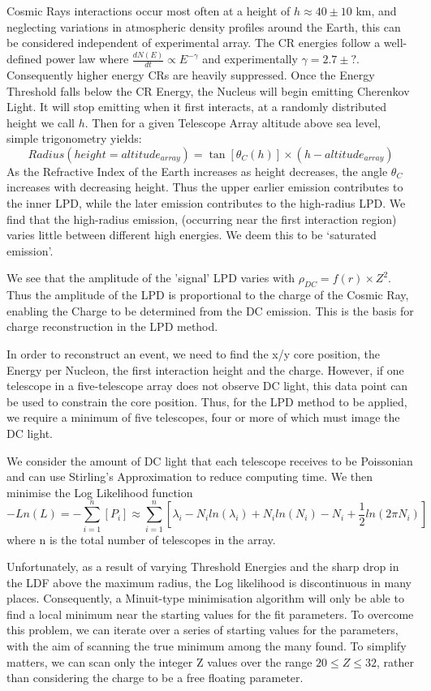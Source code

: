 \documentclass{article}
\begin{document}
Cosmic Rays interactions occur most often at a height of $h \approx 40 \pm 10$ km, and neglecting variations in atmospheric density profiles around the Earth, this can be considered independent of experimental array. The CR energies follow a well-defined power law where $ \frac{dN(E)}{dt} \propto E^{-\gamma} $ and experimentally $ \gamma = 2.7 \pm ? $. Consequently higher energy CRs are heavily suppressed. Once the Energy Threshold falls below the CR Energy, the Nucleus will begin emitting Cherenkov Light. It will stop emitting when it first interacts, at a randomly distributed height we call $h$. Then for a given Telescope Array altitude above sea level, simple trigonometry yields:
\[ Radius(height = altitude_{array}) = \tan [\theta_{C}(h)] \times (h - altitude_{array})\]
As the Refractive Index of the Earth increases as height decreases, the angle $\theta_{C}$ increases with decreasing height. Thus the upper earlier emission contributes to the inner LPD, while the later emission contributes to the high-radius LPD. We find that the high-radius emission, (occurring near the first interaction region) varies little between different high energies. We deem this to be \textquoteleft saturated emission\textquoteright.

We see that the amplitude of the 'signal' LPD varies with $ \rho_{DC}  = f(r) \times Z^{2}$. Thus the amplitude of the LPD is proportional to the charge of the Cosmic Ray, enabling the Charge to be determined from the DC emission. This is the basis for charge reconstruction in the LPD method. 

In order to reconstruct an event, we need to find the x/y core position, the Energy per Nucleon, the first interaction height and the charge. However, if one telescope in a five-telescope array does not observe DC light, this data point can be used to constrain the core position. Thus, for the LPD method to be applied, we require a minimum of five telescopes, four or more of which must image the DC light.

We consider the amount of DC light that each telescope receives to be Poissonian and can use Stirling's Approximation to reduce computing time. We then minimise the Log Likelihood function \[ - Ln(L) = - \sum_{i=1}^{n} [P_{i}] \approx  \sum_{i=1}^{n} [\lambda _{i} - N_{i} ln(\lambda _{i}) + N_{i} ln(N_{i}) - N_{i} + \frac{1}{2} ln(2 \pi N_{i})]  \]
where n is the total number of telescopes in the array.

Unfortunately, as a result of varying Threshold Energies and the sharp drop in the LDF above the maximum radius, the Log likelihood is discontinuous in many places. Consequently, a Minuit-type minimisation algorithm will only be able to find a local minimum near the starting values for the fit parameters. To overcome this problem, we can iterate over a series of starting values for the parameters, with the aim of scanning the true minimum among the many found. To simplify matters, we can scan only the integer Z values over the range $ 20 \leq Z \leq 32 $, rather than considering the charge to be a free floating parameter.
\end{document}

